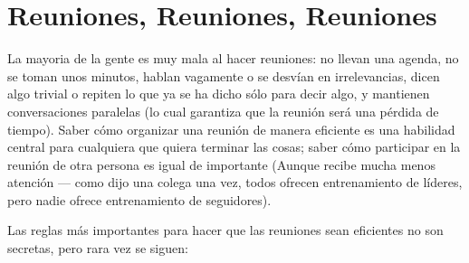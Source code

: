 \chapter{Reuniones, Reuniones, Reuniones}\label{s:meetings}

La mayoria de la gente es muy mala al hacer reuniones:
no llevan una agenda,
no se toman unos minutos,
hablan vagamente o se desvían en irrelevancias,
dicen algo trivial o repiten lo que ya se ha dicho
sólo para decir algo,
y mantienen conversaciones paralelas 
(lo cual garantiza que la reunión será una pérdida de tiempo).
Saber cómo organizar una reunión de manera eficiente
es una habilidad central para cualquiera que quiera terminar las cosas;
saber cómo participar en la reunión de otra persona es igual de importante
(Aunque recibe mucha menos atención --- como dijo una colega una vez,
todos ofrecen entrenamiento de líderes,
pero nadie ofrece entrenamiento de seguidores).

Las reglas más importantes para hacer que las reuniones sean eficientes no son secretas,
pero rara vez se siguen:

